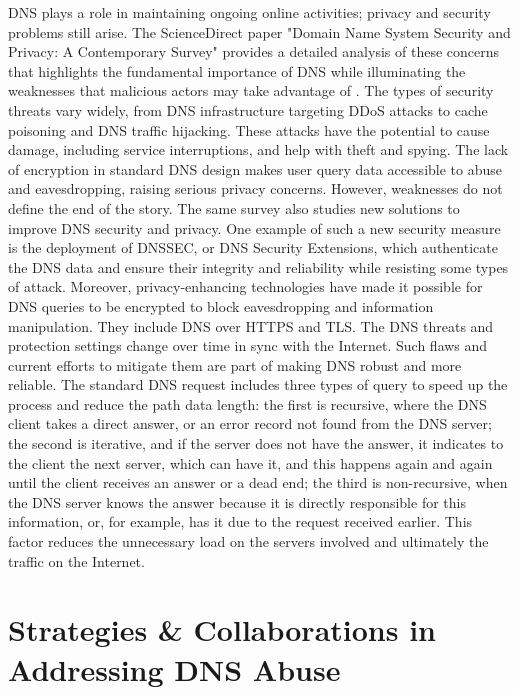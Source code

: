 DNS plays a role in maintaining ongoing online activities; privacy and security problems still arise. The ScienceDirect paper "Domain Name System Security and Privacy: A Contemporary Survey" provides a detailed analysis of these concerns that highlights the fundamental importance of DNS while illuminating the weaknesses that malicious actors may take advantage of \cite * {Sciencedirect2023dns}. The types of security threats vary widely, from DNS infrastructure targeting DDoS attacks to cache poisoning and DNS traffic hijacking. These attacks have the potential to cause damage, including service interruptions, and help with theft and spying. The lack of encryption in standard DNS design makes user query data accessible to abuse and eavesdropping, raising serious privacy concerns. However, weaknesses do not define the end of the story. The same survey also studies new solutions to improve DNS security and privacy. One example of such a new security measure is the deployment of DNSSEC, or DNS Security Extensions, which authenticate the DNS data and ensure their integrity and reliability while resisting some types of attack. Moreover, privacy-enhancing technologies have made it possible for DNS queries to be encrypted to block eavesdropping and information manipulation. They include DNS over HTTPS and TLS. The DNS threats and protection settings change over time in sync with the Internet. Such flaws and current efforts to mitigate them are part of making DNS robust and more reliable. The standard DNS request includes three types of query to speed up the process and reduce the path data length: the first is recursive, where the DNS client takes a direct answer, or an error record not found from the DNS server; the second is iterative, and if the server does not have the answer, it indicates to the client the next server, which can have it, and this happens again and again until the client receives an answer or a dead end; the third is non-recursive, when the DNS server knows the answer because it is directly responsible for this information, or, for example, has it due to the request received earlier. This factor reduces the unnecessary load on the servers involved and ultimately the traffic on the Internet.


\section{Strategies \& Collaborations in Addressing DNS Abuse}

